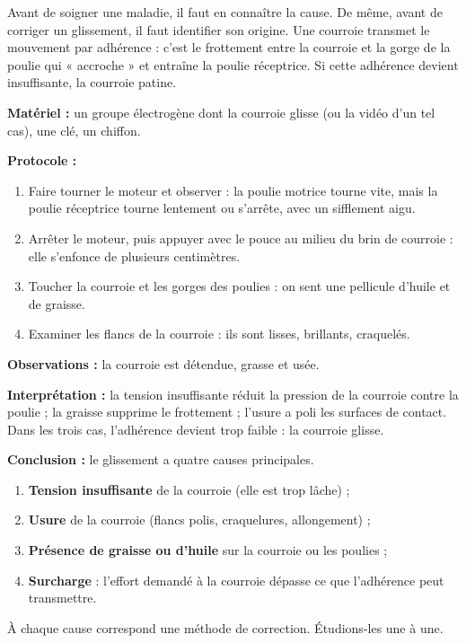 \documentclass[11pt]{article}
\newcommand{\cle}[1]{{\popxbold\color{popdark}#1}}
\newcounter{popsec}
\newcounter{popsub}
\newcommand{\courssub}[1]{%
  \stepcounter{popsub}%
  \par\vspace{9pt}\noindent{\popxbold\fontsize{11.5}{13}\selectfont\color{popink}{\color{poporange}\thepopsec.\thepopsub}\hspace{6pt}#1}\par\nopagebreak\vspace{4pt}
}
\begin{document}
\courssub{Rappel : les causes du glissement}

Avant de soigner une maladie, il faut en connaître la cause. De même, avant de corriger un glissement, il faut identifier son origine. Une courroie transmet le mouvement par \cle{adhérence} : c'est le frottement entre la courroie et la gorge de la poulie qui « accroche » et entraîne la poulie réceptrice. Si cette adhérence devient insuffisante, la courroie patine.

\begin{experience}
\textbf{Matériel :} un groupe électrogène dont la courroie glisse (ou la vidéo d'un tel cas), une clé, un chiffon.

\textbf{Protocole :}
\begin{enumerate}
\item Faire tourner le moteur et observer : la poulie motrice tourne vite, mais la poulie réceptrice tourne lentement ou s'arrête, avec un sifflement aigu.
\item Arrêter le moteur, puis appuyer avec le pouce au milieu du brin de courroie : elle s'enfonce de plusieurs centimètres.
\item Toucher la courroie et les gorges des poulies : on sent une pellicule d'huile et de graisse.
\item Examiner les flancs de la courroie : ils sont lisses, brillants, craquelés.
\end{enumerate}

\textbf{Observations :} la courroie est détendue, grasse et usée.

\textbf{Interprétation :} la tension insuffisante réduit la pression de la courroie contre la poulie ; la graisse supprime le frottement ; l'usure a poli les surfaces de contact. Dans les trois cas, l'adhérence devient trop faible : la courroie glisse.

\textbf{Conclusion :} le glissement a quatre causes principales.
\end{experience}

\begin{aretenir}
\begin{enumerate}
\item \textbf{Tension insuffisante} de la courroie (elle est trop lâche) ;
\item \textbf{Usure} de la courroie (flancs polis, craquelures, allongement) ;
\item \textbf{Présence de graisse ou d'huile} sur la courroie ou les poulies ;
\item \textbf{Surcharge} : l'effort demandé à la courroie dépasse ce que l'adhérence peut transmettre.
\end{enumerate}
À chaque cause correspond une méthode de correction. Étudions-les une à une.
\end{aretenir}
\end{document}
